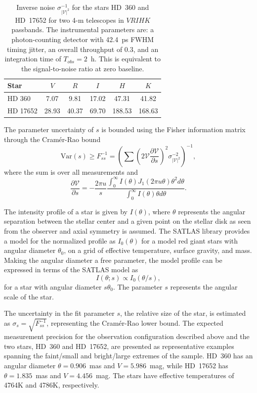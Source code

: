\documentclass[linenumbers,trackchanges]{aastex701}
\begin{document}
\begin{table}
\begin{tabular}{lccccc}
\hline
Star & $V$ & $R$ & $I$ & $H$ & $K$ \\
\hline
HD 360 & 7.07 & 9.81 & 17.02 & 47.31 & 41.82 \\
HD 17652 & 28.93 & 40.37 & 69.70 & 188.53 & 168.63 \\
\hline
\end{tabular}
\caption{Inverse noise $\sigma^{-1}_{|\mathcal{V}|^2}$  for the stars HD~360 and HD~17652 for two
4-m telescopes in $VRIHK$ passbands.
The instrumental parameters are: a photon-counting detector with 42.4~ps FWHM timing jitter,
an overall throughput of 0.3, and an integration time of $T_{obs}=2$~h.  This is equivalent to the signal-to-noise ratio at zero baseline. }\label{tab:inverse_noise}
\end{table}


The parameter uncertainty of $s$ is bounded using the Fisher information matrix through the Cram\'er-Rao bound
\begin{equation}
\text{Var}(s) \ge F_{ss}^{-1} =   \left(\sum \left(2 \mathcal{V}\frac{\partial \mathcal{V}}{\partial s}  \right)^2 \sigma_{|\mathcal{V}|^2}^{-2} \right)^{-1},
\end{equation}
where the sum is over all measurements and
\begin{equation}
    \frac{\partial \mathcal{V}}{\partial s} = -\frac{2\pi u}{s}
     \frac{ \int_0^\infty{I(\theta) J_1(2 \pi u\theta) \theta^2 d\theta}}
    {\int_0^\infty{I(\theta)\theta d\theta}}.
\end{equation}


The intensity profile of a star is given by $I(\theta)$, where
$\theta$ represents the angular separation between the stellar center and a given point on the stellar disk as seen from the observer and axial symmetry is assumed.
The SATLAS
library provides a model for the normalized profile as $I_0(\theta)$ for
a model red giant stars with angular diameter
$\theta_0$, on a grid of effective temperature, surface gravity, and mass.
Making the angular diameter a free parameter,
the model profile can be expressed in terms of the SATLAS model as
\begin{equation}
    I(\theta; s) \propto I_0(\theta/s),
\end{equation}
for a star with angular diameter $s\theta_0$.  The
parameter $s$ represents the angular scale of the star.

The uncertainty in the fit parameter $s$, the relative size of the star, is estimated 
as $\sigma_s = \sqrt{F_{ss}^{-1}}$, representing the Cram\'er-Rao lower bound.
The expected measurement precision for the observation configuration described above
and the two stars, HD~360 and HD~17652, are presented as representative examples spanning the faint/small and bright/large extremes of the sample. HD~360 has an angular diameter $\theta = 0.906$~mas and $V = 5.986$~mag, while HD~17652 has $\theta = 1.835$~mas and $V = 4.456$~mag. The stars have effective temperatures of 4764K and 4786K, respectively.
\end{document}
